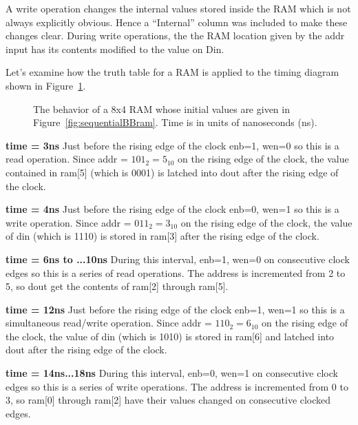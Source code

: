 A write operation changes the internal values stored inside the RAM which is not always explicitly obvious.  Hence a 
``Internal'' column was included to make these changes clear.  During write operations, the the RAM location given by
the addr input has its contents modified to the value on Din.


Let's examine how the truth table for a RAM is applied to the timing diagram shown in Figure~\ref{fig:sequentialBBRamReadWrite}.

\begin{landscape}
\begin{figure}[ht]


\caption{The behavior of a 8x4 RAM whose initial values are given in Figure~\ref{fig:sequentialBBram}.
Time is in units of nanoseconds (ns).}
\label{fig:sequentialBBRamReadWrite}
\end{figure}



\color{red}
\textbf{time = 3ns} Just before the rising edge of the clock  enb=1, wen=0 so this is a read operation.  
Since addr = $101_2 = 5_{10}$ on the rising edge of the clock, the value contained in ram[5] (which is
0001) is latched into dout after the rising edge of the clock.

\color{orange}
\textbf{time = 4ns} Just before the rising edge of the clock  enb=0, wen=1 so this is a write operation.  
Since addr = $011_2 = 3_{10}$ on the rising edge of the clock, the value of din (which is 1110) is stored
in ram[3]  after the rising edge of the clock.

\color{lime}
\textbf{time = 6ns to ...10ns}  During this interval,  enb=1, wen=0 on consecutive clock edges so this 
is a series of read operations.  The address is incremented from 2 to 5, so dout get the contents of 
ram[2] through ram[5].

\color{green}
\textbf{time = 12ns} Just before the rising edge of the clock  enb=1, wen=1 so this is a simultaneous read/write operation.  
Since addr = $110_2 = 6_{10}$ on the rising edge of the clock, the value of din (which is 1010) is stored
in ram[6] and latched into dout after the rising edge of the clock.

\color{blue}
\textbf{time = 14ns...18ns} During this interval, enb=0, wen=1 on consecutive clock edges so this 
is a series of write operations.  The address is incremented from 0 to 3, so ram[0] through ram[2] have 
their values changed on consecutive clocked edges.

\color{black}

\end{landscape}



